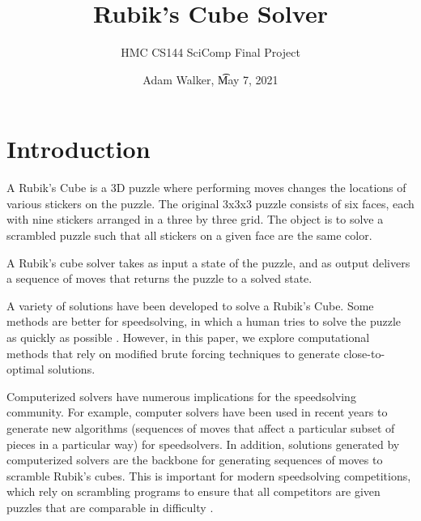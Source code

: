 \documentclass{article}
\title{Rubik's Cube Solver}
\author{HMC CS144 SciComp Final Project}
\date{Adam Walker, \t May 7, 2021}
\begin{document}
\maketitle

\section{Introduction}

A Rubik's Cube is a 3D puzzle where performing moves changes the locations of various stickers on the puzzle. The original 3x3x3 puzzle consists of six faces, each with nine stickers arranged in a three by three grid. The object is to solve a scrambled puzzle such that all stickers on a given face are the same color.

A Rubik's cube solver takes as input a state of the puzzle, and as output delivers a sequence of moves that returns the puzzle to a solved state.

A variety of solutions have been developed to solve a Rubik's Cube. Some methods are better for speedsolving, in which a human tries to solve the puzzle as quickly as possible \cite{speedcubing}. However, in this paper, we explore computational methods that rely on modified brute forcing techniques to generate close-to-optimal solutions.

Computerized solvers have numerous implications for the speedsolving community. For example, computer solvers have been used in recent years to generate new algorithms (sequences of moves that affect a particular subset of pieces in a particular way) for speedsolvers. In addition, solutions generated by computerized solvers are the backbone for generating sequences of moves to scramble Rubik's cubes. This is important for modern speedsolving competitions, which rely on scrambling programs to ensure that all competitors are given puzzles that are comparable in difficulty \cite{wca-scrambles}.

\end{document}
